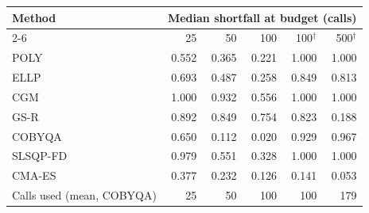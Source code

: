 \begin{tabular}{@{}lrrrrr@{}}
\toprule
Method & \multicolumn{5}{c}{Median shortfall at budget (calls)} \\
\cmidrule(l){2-6}
 & 25 & 50 & 100 & 100$^{\dagger}$ & 500$^{\dagger}$ \\
\midrule
POLY & 0.552 & 0.365 & 0.221 & 1.000 & 1.000 \\
ELLP & 0.693 & 0.487 & 0.258 & 0.849 & 0.813 \\
CGM & 1.000 & 0.932 & 0.556 & 1.000 & 1.000 \\
GS-R & 0.892 & 0.849 & 0.754 & 0.823 & 0.188 \\
COBYQA & 0.650 & 0.112 & 0.020 & 0.929 & 0.967 \\
SLSQP-FD & 0.979 & 0.551 & 0.328 & 1.000 & 1.000 \\
CMA-ES & 0.377 & 0.232 & 0.126 & 0.141 & 0.053 \\
\midrule
Calls used (mean, COBYQA) & 25 & 50 & 100 & 100 & 179 \\
\bottomrule
\end{tabular}
